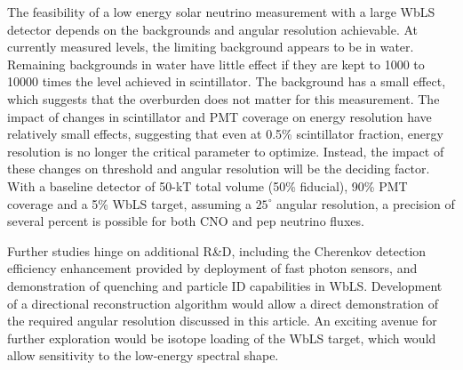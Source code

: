 \documentclass[11pt,prd,letterpaper,amsmath,amssymb,final,nofootinbib
,unsortedaddress,superscriptaddress
]{revtex4-1}
\begin{document}
The feasibility of a low energy solar neutrino measurement with a large WbLS detector depends on the backgrounds and angular resolution achievable. At currently measured levels, the limiting background appears to be  in water.  Remaining backgrounds in water have little effect if they are kept to 1000 to 10000 times the level achieved in scintillator. The  background has a small effect, which suggests that the overburden does not matter for this measurement. The impact of changes in scintillator and PMT coverage on energy resolution have relatively small effects,  suggesting that even at 0.5\% scintillator fraction, energy resolution is no longer the critical parameter to optimize. Instead, the impact of these changes on threshold and angular resolution will be the deciding factor.  With a baseline detector of 50-kT total volume (50\% fiducial), 90\% PMT coverage and a 5\% WbLS target, assuming  a $25^\circ$ angular resolution, a precision of several percent is possible for both CNO and pep neutrino fluxes.

Further studies hinge on additional R\&D, including the Cherenkov detection efficiency enhancement provided by deployment of fast photon sensors, and demonstration of quenching and particle ID capabilities in WbLS.  Development of a directional reconstruction algorithm would allow a direct demonstration of the required angular resolution discussed in this article.  An exciting avenue for further exploration would be isotope loading of the WbLS target, which would allow sensitivity to the low-energy spectral shape.
\end{document}
